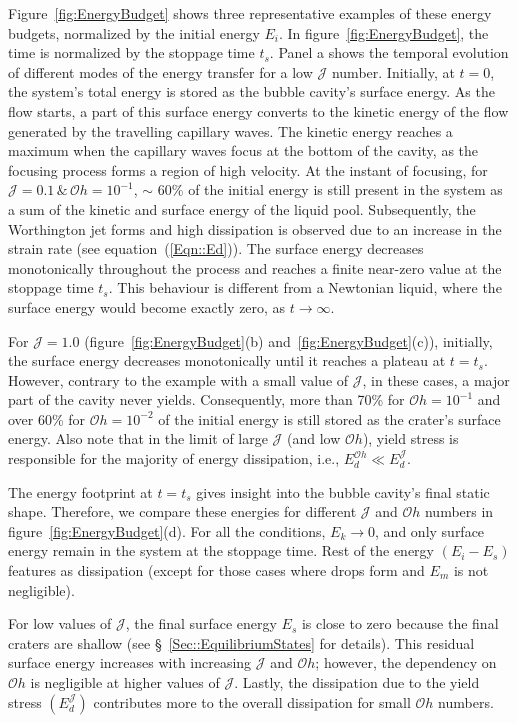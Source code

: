 \documentclass[final]{jfm}
\begin{document}
Figure~\ref{fig:EnergyBudget} shows three representative examples of these energy budgets, normalized by the initial energy $E_i$. In figure~\ref{fig:EnergyBudget}, the time is normalized by the stoppage time $t_s$. Panel a shows the temporal evolution of different modes of the energy transfer for a low $\mathcal{J}$ number. 
Initially, at $t = 0$, the system's total energy is stored as the bubble cavity's surface energy. 
As the flow starts, a part of this surface energy converts to the kinetic energy of the flow generated by the travelling capillary waves. The kinetic energy reaches a maximum when the capillary waves focus at the bottom of the cavity, as the focusing process forms a region of high velocity. At the instant of focusing, for $\mathcal{J} = 0.1\,\&\,\mathcal{O}h = 10^{-1}$, $\sim$ 60\% of the initial energy is still present in the system as a sum of the kinetic and surface energy of the liquid pool. Subsequently, the Worthington jet forms and high dissipation is observed due to an increase in the strain rate (see equation~(\ref{Eqn::Ed})). The surface energy decreases monotonically throughout the process and reaches a finite near-zero value at the stoppage time $t_s$. This behaviour is different from a Newtonian liquid, where the surface energy would become exactly zero, as $t \to \infty$.

For $\mathcal{J} = 1.0$ (figure~\ref{fig:EnergyBudget}(b) and~\ref{fig:EnergyBudget}(c)), initially, the surface energy decreases monotonically until it reaches a plateau at $t = t_s$. However, contrary to the example with a small value of $\mathcal{J}$, in these cases, a major part of the cavity never yields. Consequently, more than 70\% for $\mathcal{O}h =10^{-1}$ and over 60\% for $\mathcal{O}h =10^{-2}$ of the initial energy is still stored as the crater's surface energy. Also note that in the limit of large $\mathcal{J}$ (and low $\mathcal{O}h$), yield stress is responsible for the majority of energy dissipation, i.e., $E_d^{\mathcal{O}h} \ll E_d^\mathcal{J}$.

The energy footprint at $t = t_s$ gives insight into the bubble cavity's final static shape. Therefore, we compare these energies for different $\mathcal{J}$ and $\mathcal{O}h$ numbers in figure~\ref{fig:EnergyBudget}(d). For all the conditions, $E_k \to 0$, and only surface energy remain in the system at the stoppage time. Rest of the energy $\left(E_i - E_s\right)$ features as dissipation (except for those cases where drops form and $E_m$ is not negligible). 

For low values of $\mathcal{J}$, the final surface energy $E_s$ is close to zero because the final craters are shallow (see \S~\ref{Sec::EquilibriumStates} for details). This residual surface energy increases with increasing $\mathcal{J}$ and $\mathcal{O}h$; however, the dependency on $\mathcal{O}h$ is negligible at higher values of $\mathcal{J}$. Lastly, the dissipation due to the yield stress $\left(E_d^\mathcal{J}\right)$ contributes more to the overall dissipation for small $\mathcal{O}h$ numbers.
\end{document}
